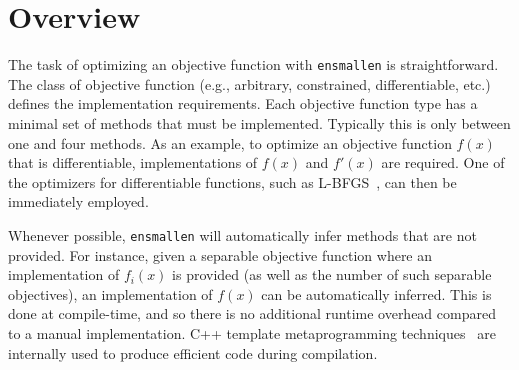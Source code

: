 \section{Overview}
\label{sec:overview}



% 

The task of optimizing an objective function with {\tt ensmallen} is
straightforward.  The class of objective function (e.g., arbitrary, constrained,
differentiable, etc.) defines the implementation requirements.
Each objective function type has a minimal set of methods that must be implemented.
Typically this is only between one and four methods.
As an example,
to optimize an objective function $f(x)$ that is differentiable,
implementations of $f(x)$ and $f'(x)$ are required.
One of the optimizers for differentiable functions,
such as L-BFGS~\cite{liu1989limited},
can then be immediately employed.

Whenever possible, {\tt ensmallen} will automatically infer methods that are
not provided.  For instance, given a separable objective function where an
implementation of $f_i(x)$ is provided (as well as the number of such separable
objectives), an implementation of $f(x)$ can be automatically inferred.
This is done at compile-time, and so there is no additional runtime overhead
compared to a manual implementation.
C++ template metaprogramming techniques~\cite{abrahams2004c++,alexandrescu2001modern,
veldhuizen1998c++} are internally used to produce efficient code during compilation.

